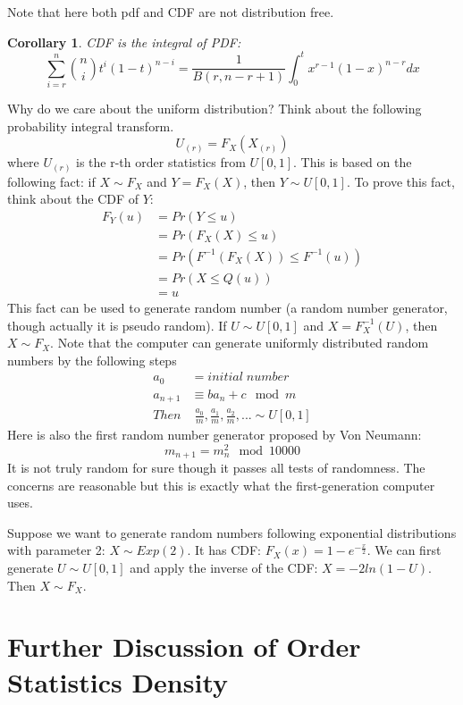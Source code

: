 \documentclass[twoside]{article}
\newtheorem*{corollary*}{Corollary}
\begin{document}
	Note that here both pdf and CDF are not distribution free. 
	\begin{corollary*}
		CDF is the integral of PDF:
		$$
		\sum_{i=r}^n \binom{n}{i} t^i (1 - t)^{n-i} = \frac{1}{B(r, n-r+1)} \int_{0}^{t} x^{r-1} (1-x)^{n-r} dx
		$$
	\end{corollary*}
	Why do we care about the uniform distribution? Think about the following probability integral transform.
	$$
	U_{(r)} = F_X (X_{(r)})
	$$
	where $U_{(r)}$ is the r-th order statistics from $U[0, 1]$. This is based on the following fact: if $X \sim F_X$ and $Y = F_X (X)$, then $Y \sim U[0, 1]$. To prove this fact, think about the CDF of $Y$:
	\begin{align*}
		F_Y (u) &= Pr \left( Y \leqslant u \right) \\
		&= Pr \left( F_X (X) \leqslant u \right) \\
		&= Pr \left( F^{-1} (F_X (X)) \leqslant F^{-1} (u) \right) \\
		&= Pr \left(X \leqslant Q(u) \right) \\
		&= u
	\end{align*}
	This fact can be used to generate random number (a random number generator, though actually it is pseudo random). If $U \sim U[0, 1]$ and $X = F_X^{-1} (U)$, then $X \sim F_X$. Note that the computer can generate uniformly distributed random numbers by the following steps
	\begin{align*}
		a_0 &= initial \; number \\
		a_{n+1} &\equiv b a_n + c \mod m \\
		Then & \; \frac{a_0}{m}, \frac{a_1}{m}, \frac{a_2}{m}, ... \sim U [0,1]
	\end{align*}
	Here is also the first random number generator proposed by Von Neumann: 
	$$
	m_{n+1} = m_n^2 \mod 10000
	$$
	It is not truly random for sure though it passes all tests of randomness. The concerns are reasonable but this is exactly what the first-generation computer uses. 
	
	Suppose we want to generate random numbers following exponential distributions with parameter 2: $X \sim Exp(2)$. It has CDF: $F_X(x) = 1 - e^{- \frac{x}{2}}$. We can first generate $U \sim U[0, 1]$ and apply the inverse of the CDF: $X = -2 ln(1-U)$. Then $X \sim F_X$. 
	
	\section{Further Discussion of Order Statistics Density}
	
\end{document}
